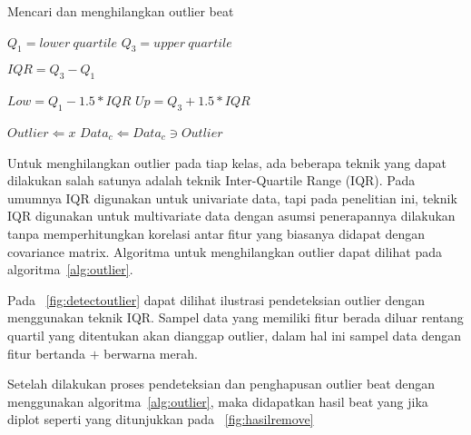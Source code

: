 \begin{algorithm}
\scriptsize 
\caption{Mencari dan menghilangkan outlier beat}          
\label{alg:outlier}                           
\begin{algorithmic}                    %
			\STATE $Q_1 = lower\ quartile $  
			\STATE $Q_3 = upper\ quartile $ 
			
			\STATE
			\STATE $IQR = Q_3 - Q_1$ 
			
			\STATE
			\STATE {}
			\STATE $Low = Q_1 - 1.5 * IQR $ 
			\STATE $Up  = Q_3 + 1.5 * IQR $
			
			\STATE
			\STATE {}
				 	\STATE $Outlier \Leftarrow  x$ 
				\ENDIF
			\ENDFOR
		\ENDFOR
		\STATE $Data_c \Leftarrow Data_c \ni Outlier$
	\ENDFOR
\end{algorithmic}
\end{algorithm}

Untuk menghilangkan outlier pada tiap kelas, ada beberapa teknik yang dapat
dilakukan salah satunya adalah teknik Inter-Quartile Range (IQR). Pada umumnya
IQR digunakan untuk univariate data, tapi pada penelitian ini, teknik IQR
digunakan untuk multivariate data dengan asumsi penerapannya dilakukan tanpa
memperhitungkan korelasi antar fitur yang biasanya didapat dengan covariance
matrix. Algoritma untuk menghilangkan outlier dapat dilihat pada
algoritma~\ref{alg:outlier}.


Pada \pic~\ref{fig:detectoutlier}  dapat dilihat ilustrasi pendeteksian outlier
dengan menggunakan teknik IQR. Sampel data yang memiliki fitur berada diluar
rentang quartil yang ditentukan akan dianggap outlier, dalam hal ini sampel data
dengan fitur bertanda $+$ berwarna merah.


Setelah dilakukan proses pendeteksian dan penghapusan outlier beat dengan
menggunakan algoritma~\ref{alg:outlier}, maka didapatkan hasil beat yang jika
diplot seperti yang ditunjukkan pada \pic~\ref{fig:hasilremove}

